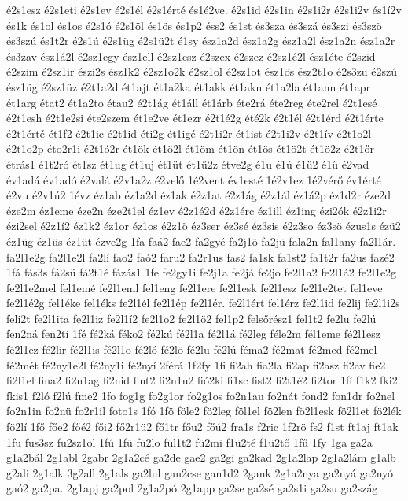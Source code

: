 {é2s1esz
é2s1eti
é2s1ev
é2s1él
é2s1érté
és1é2ve.
é2s1id
é2s1in
é2s1i2r
é2s1i2v
és1í2v
és1k
és1ol
és1os
é2s1ó
é2s1öl
és1ös
és1p2
éss2
és1st
és3sza
és3szá
és3szi
és3szö
és3szú
és1t2r
é2s1ú
é2s1üg
é2s1ü2t
é1sy
ész1a2d
ész1a2g
ész1a2l
ész1a2n
ész1a2r
és3zav
ész1á2l
é2sz1egy
ész1ell
é2sz1esz
é2szex
é2szez
é2sz1é2l
ész1éte
é2szid
é2szim
é2sz1ir
észi2s
ész1k2
é2sz1o2k
é2sz1ol
é2sz1ot
ész1ös
ész2t1o
é2s3zu
é2szú
ész1üg
é2sz1üz
é2t1a2d
ét1ajt
ét1a2ka
ét1akk
ét1akn
ét1a2la
ét1ann
ét1apr
ét1arg
état2
ét1a2to
étau2
é2t1ág
ét1áll
ét1árb
éte2rá
éte2reg
éte2rel
é2t1esé
é2t1esh
é2t1e2si
éte2szem
ét1e2ve
ét1ezr
é2t1é2g
été2k
é2t1él
é2t1érd
é2t1érte
é2t1érté
ét1f2
é2t1ic
é2t1id
éti2g
ét1igé
é2t1i2r
ét1ist
é2t1i2v
é2t1ív
é2t1o2l
é2t1o2p
éto2r1i
é2t1ó2r
ét1ök
ét1ö2l
ét1öm
ét1ön
ét1ös
ét1ö2t
ét1ö2z
é2t1őr
étrás1
é1t2ró
ét1sz
ét1ug
ét1uj
ét1üt
ét1ű2z
étve2g
é1u
é1ú
é1ü2
é1ű
é2vad
év1adá
év1adó
é2valá
é2v1a2z
é2velő
1é2vent
év1esté
1é2v1ez
1é2vérő
év1érté
é2vu
é2v1ú2
1évz
éz1ab
éz1a2d
éz1ak
é2z1at
é2z1ág
é2z1ál
éz1á2p
éz1d2r
éze2d
éze2m
éz1eme
éze2n
éze2t1el
éz1ev
é2z1é2d
é2z1érc
éz1ill
éz1ing
ézi2ók
é2z1i2r
ézi2sel
é2z1í2
éz1k2
éz1or
éz1os
é2z1ö
éz3ser
éz3sé
éz3sis
é2z3so
éz3sö
ézus1s
ézü2
éz1üg
éz1üs
éz1üt
ézve2g
1fa
faá2
fae2
fa2gyé
fa2j1ö
fa2jü
fala2n
fal1any
fa2l1ár.
fa2l1e2g
fa2l1e2l
fa2lí
fao2
faó2
faru2
fa2r1us
fas2
fa1sk
fa1st2
fa1t2r
fa2us
fazé2
1fá
fás3s
fá2sü
fá2t1é
fázás1
1fe
fe2gy1i
fe2j1a
fe2já
fe2jo
fe2l1a2
fe2l1á2
fe2l1e2g
fe2l1e2mel
fel1emé
fe2l1eml
fel1eng
fe2l1ere
fe2l1esk
fe2l1esz
fe2l1e2tet
fel1eve
fe2l1é2g
fel1éke
fel1éks
fe2l1él
fe2l1ép
fe2l1ér.
fe2l1ért
fel1érz
fe2l1id
fe2lij
fe2l1i2s
feli2t
fe2l1ita
fe2l1iz
fe2l1í2
fe2l1o2
fe2l1ö2
fel1p2
felsőrész1
fel1t2
fe2lu
fe2lú
fen2ná
fen2tí
1fé
fé2ká
féko2
fé2kú
fé2l1a
fé2l1á
fé2leg
féle2m
fél1eme
fé2l1esz
fé2l1ez
fé2lir
fé2l1is
fé2l1o
fé2ló
fé2lö
fé2lu
fé2lú
féma2
fé2mat
fé2med
fé2mel
fé2mét
fé2ny1e2l
fé2ny1i
fé2nyí
2férá
1f2fy
1fi
fi2ah
fia2la
fi2ap
fi2asz
fi2av
fie2
fi2l1el
fina2
fi2n1ag
fi2nid
fint2
fi2n1u2
fió2ki
fi1sc
fist2
fi2t1é2
fi2tor
1fí
f1k2
fki2
fkis1
f2ló
f2lú
fme2
1fo
fog1g
fo2g1or
fo2g1os
fo2n1au
fo2nát
fond2
fon1dr
fo2nel
fo2n1in
fo2nü
fo2r1il
foto1s
1fó
1fö
föle2
fö2leg
föl1el
fö2len
fö2l1esk
fö2l1et
fö2lék
fö2lí
1fő
főe2
főé2
fői2
fő2r1ü2
fő1tr
főu2
főú2
fra1s
f2ric
1f2rö
fs2
f1st
ft1aj
ft1ak
1fu
fus3sz
fu2sz1ol
1fú
1fü
fü2lo
fül1t2
fü2mi
f1ü2té
f1ü2tő
1fű
1fy
1ga
ga2a
g1a2bál
2g1abl
2gabr
2g1a2cé
ga2de
gae2
ga2gi
ga2kad
2g1a2lap
2g1a2lám
g1alb
g2ali
2g1alk
3g2all
2g1als
ga2lul
gan2cse
gan1d2
2gank
2g1a2nya
ga2nyá
ga2nyó
gaó2
ga2pa.
2g1apj
ga2pol
2g1a2pó
2g1app
ga2se
ga2sé
ga2s1i
ga2su
ga2szág
}
